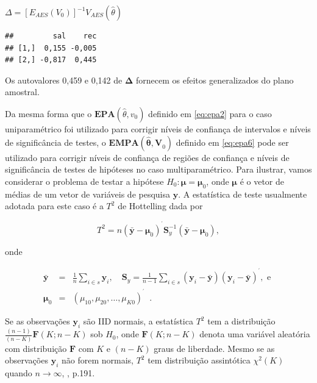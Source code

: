 \documentclass[]{book}
\theoremstyle{definition}
\theoremstyle{definition}
\theoremstyle{definition}
\theoremstyle{remark}
\begin{document}
\(\Delta = \left[ E_{AES}\left( V_{0}\right)\right]^{-1}V_{AES}(\hat{\theta})\)

\begin{verbatim}
##         sal    rec
## [1,]  0,155 -0,005
## [2,] -0,817  0,445
\end{verbatim}

Os autovalores 0,459 e 0,142 de \(\mathbf{\Delta}\) fornecem os efeitos
generalizados do plano amostral.

Da mesma forma que o \(\mathbf{EPA}\left( \hat{\theta},v_{0}\right)\)
definido em \eqref{eq:epa2} para o caso uniparamétrico foi utilizado para
corrigir níveis de confiança de intervalos e níveis de significância de
testes, o \(\mathbf{EMPA}(\mathbf{\hat{\theta},V}_{0})\) definido em
\eqref{eq:epa6} pode ser utilizado para corrigir níveis de confiança de
regiões de confiança e níveis de significância de testes de hipóteses no
caso multiparamétrico. Para ilustrar, vamos considerar o problema de
testar a hipótese \(H_{0}:\mathbf{\mu }=\mathbf{\mu }_{0}\), onde
\(\mathbf{\mu }\) é o vetor de médias de um vetor de variáveis de
pesquisa \(\mathbf{y}\). A estatística de teste usualmente adotada para
este caso é a \(T^{2}\) de Hottelling dada por

\begin{equation}
T^{2}=n\left( \mathbf{\bar{y}-\mu }_{0}\right) ^{^{\prime }}\mathbf{S}
_{y}^{-1}\left( \mathbf{\bar{y}-\mu }_{0}\right) , \label{eq:epa11} 
\end{equation}

onde

\begin{eqnarray*}
\mathbf{\bar{y}} &=&\frac{1}{n}\sum\limits_{i\in s}\mathbf{y}_{i},\quad 
\mathbf{S}_{y}=\frac{1}{n-1}\sum\limits_{i\in s}\left( \mathbf{y}_{i}-
\mathbf{\bar{y}}\right) \left( \mathbf{y}_{i}-\mathbf{\bar{y}}\right)
^{^{\prime }},\mbox{ e } \\
\mathbf{\mu }_{0} &=&\left( \mu _{10},\mu _{20},\ldots ,\mu _{K0}\right)
^{^{\prime }}\;\;.
\end{eqnarray*}

Se as observações \(\mathbf{y}_{i}\) são IID normais, a estatística
\(T^{2}\) tem a distribuição
\(\frac{\left( n-1\right) }{\left( n-K\right)}\mathbf{F}\left( K;n-K\right)\)
sob \(H_{0}\), onde \(\mathbf{F}\left( K;n-K\right)\) denota uma
variável aleatória com distribuição \(\mathbf{F}\) com \(K\) e
\(\left( n-K\right)\) graus de liberdade. Mesmo se as observações
\(\mathbf{y}_{i}\) não forem normais, \(T^{2}\) tem distribuição
assintótica \(\chi ^{2}\left(K\right)\) quando \(n\rightarrow \infty\),
\citep{Johnson}, p.191.
\end{document}
